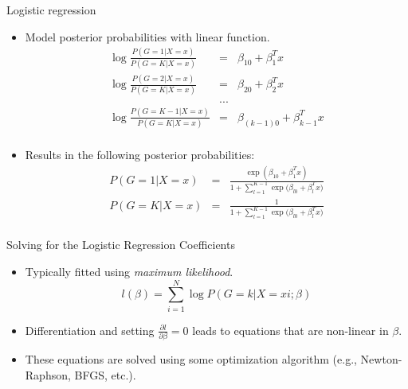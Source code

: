 \documentclass[aspectratio=169]{beamer}
\begin{document}
\begin{frame}{Logistic regression}
    \begin{itemize}
        \item Model posterior probabilities with linear function.
        \begin{eqnarray*}
            \log{\frac{P(G=1|X=x)}{P(G=K|X=x)}} & = & \beta_{10} + \beta_1^T x\\
            \log{\frac{P(G=2|X=x)}{P(G=K|X=x)}} & = & \beta_{20} + \beta_2^T x\\
            & ... &\\
            \log{\frac{P(G=K-1|X=x)}{P(G=K|X=x)}} & = & \beta_{(k-1)0} + \beta_{k-1}^T x\\
        \end{eqnarray*}
        \item Results in the following posterior probabilities:
        \begin{eqnarray*}
            P(G=1|X=x) & = & \frac{\exp{(\beta_{10} + \beta_1^T x)}}{1 + \sum_{l=1}^{K-1}\exp{(\beta_{l0} + \beta_l^T x})}\\
            P(G=K|X=x) & = & \frac{1}{1 + \sum_{l=1}^{K-1}\exp{(\beta_{l0} + \beta_l^T x})}\\
        \end{eqnarray*}
    \end{itemize}
\end{frame} 


\begin{frame}{Solving for the Logistic Regression Coefficients}
    \begin{itemize}
        \item Typically fitted using \textit{maximum likelihood}.
        \begin{equation*}
            l(\beta) = \sum_{i=1}^N \log {P(G = k | X = x i; \beta)}
        \end{equation*}
        \item Differentiation and setting $\frac{\partial{l}}{\partial{\beta}} = 0$ leads to equations that are non-linear in $\beta$.
        \item These equations are solved using some optimization algorithm (e.g., Newton-Raphson, BFGS, etc.). 
    \end{itemize}
\end{frame} 
\end{document}
